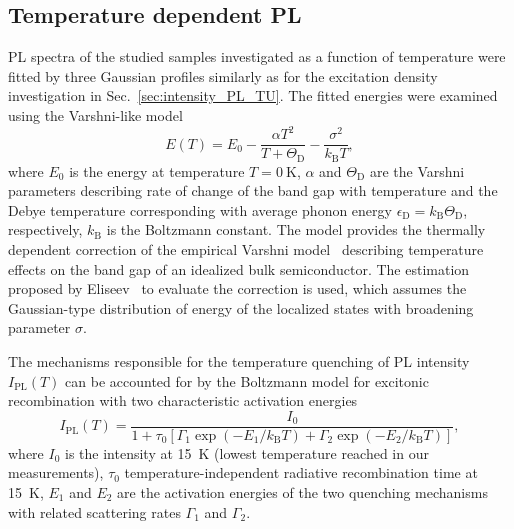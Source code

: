 \subsection{Temperature dependent PL}
\label{Sec:temp_PL_TU}
PL spectra of the studied samples investigated as a function of temperature were fitted by three Gaussian profiles similarly as for the excitation density investigation in Sec.~\ref{sec:intensity_PL_TU}. The fitted energies were examined using the Varshni-like model
%
\begin{equation}
E(T)=E_0-\frac{\alpha T^2}{T+\Theta_\mathrm{D}}-\frac{\sigma^2}{k_\mathrm{B}T}, \label{eq:Varshni-like}
\end{equation}
where $E_0$ is the energy at temperature $T=0~\mathrm{K}$, $\alpha$ and $\Theta_\mathrm{D}$ are the Varshni parameters describing rate of change of the band gap with temperature and the Debye temperature corresponding with average phonon energy $\epsilon_\mathrm{D}=k_\mathrm{B}\Theta_\mathrm{D}$, respectively, $k_\mathrm{B}$ is the Boltzmann constant. The model provides the thermally dependent correction of the empirical Varshni model~\citep{Varshni} describing temperature effects on the band gap of an idealized bulk semiconductor. The estimation proposed by Eliseev~\citep{Eliseev_apl2003_PLtemp} to evaluate the correction is used, which assumes the Gaussian-type distribution of energy of the localized states with broadening parameter $\sigma$.

The mechanisms responsible for the temperature quenching of PL intensity $I_\mathrm{PL}(T)$ can be accounted for by the Boltzmann model for excitonic recombination with two characteristic activation energies~\citep{Daly_prb1995, Alen_apl2011}
\begin{equation}
I_\mathrm{PL}(T)=\frac{I_0}{1+\tau_0\left[\Gamma_1\exp(-E_1/k_\mathrm{B}T)+\Gamma_2\exp(-E_2/k_\mathrm{B}T)\right]},               \label{eq:Arhenius}
\end{equation}
where $I_0$ is the intensity at 15~K (lowest temperature reached in our measurements), $\tau_0$ temperature-independent radiative recombination time at 15~K, $E_1$ and $E_2$ are the activation energies of the two quenching mechanisms with related scattering rates $\Gamma_1$ and $\Gamma_2$.%
\newpage
